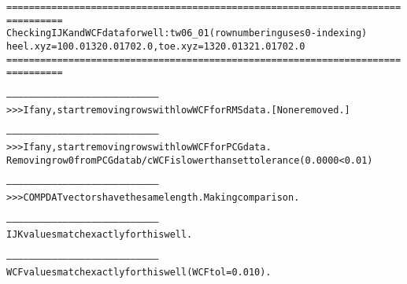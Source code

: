\begin{alltt}
================================================================================
Checking IJK and WCF data for well: tw06_01 (row numbering uses 0-indexing)
heel.xyz = 100.0 1320.0 1702.0, toe.xyz = 1320.0 1321.0 1702.0
================================================================================

--------------------------------------------------------------------------------
>>> If any, start removing rows with low WCF for RMS data. [None removed.]

--------------------------------------------------------------------------------
>>> If any, start removing rows with low WCF for PCG data.
Removing row 0 from PCG data b/c WCF is lower than set tolerance (0.0000 < 0.01)

--------------------------------------------------------------------------------
>>> COMPDAT vectors have the same length. Making comparison.

--------------------------------------------------------------------------------
IJK values match exactly for this well.

--------------------------------------------------------------------------------
WCF values match exactly for this well (WCF tol = 0.010).
\end{alltt}
